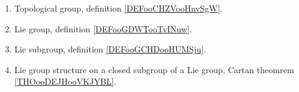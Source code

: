 
\begin{enumerate}
	\item
	      Topological group, definition \ref{DEFooCHZVooHnvSgW}.
	\item
	      Lie group, definition \ref{DEFooGDWTooTvINuw}.
	\item
	      Lie subgroup, definition \ref{DEFooGCHDooHUMSju}.
	\item
	      Lie group structure on a closed subgroup of a Lie group, Cartan theomrem \ref{THOooDEJHooVKJYBL}.
\end{enumerate}


